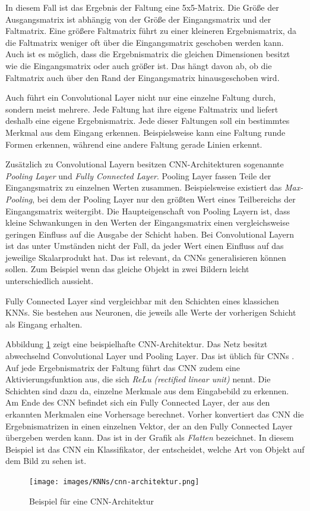 In diesem Fall ist das Ergebnis der Faltung eine 5x5-Matrix. Die Größe der Ausgangsmatrix ist abhängig von der Größe der Eingangsmatrix und der Faltmatrix. Eine größere Faltmatrix führt zu einer kleineren Ergebnismatrix, da die Faltmatrix weniger oft über die Eingangsmatrix geschoben werden kann. Auch ist es möglich, dass die Ergebnismatrix die gleichen Dimensionen besitzt wie die Eingangsmatrix oder auch größer ist. Das hängt davon ab, ob die Faltmatrix auch über den Rand der Eingangsmatrix hinausgeschoben wird. \cite{knnsKompakt}

Auch führt ein Convolutional Layer nicht nur eine einzelne Faltung durch, sondern meist mehrere. Jede Faltung hat ihre eigene Faltmatrix und liefert deshalb eine eigene Ergebnismatrix. Jede dieser Faltungen soll ein bestimmtes Merkmal aus dem Eingang erkennen. Beispielsweise kann eine Faltung runde Formen erkennen, während eine andere Faltung gerade Linien erkennt. 

Zusätzlich zu Convolutional Layern besitzen \ac{CNN}-Architekturen sogenannte \emph{Pooling Layer} und \emph{Fully Connected Layer}. Pooling Layer fassen Teile der Eingangsmatrix zu einzelnen Werten zusammen. Beispielsweise existiert das \emph{Max-Pooling}, bei dem der Pooling Layer nur den größten Wert eines Teilbereichs der Eingangsmatrix weitergibt. Die Haupteigenschaft von Pooling Layern ist, dass kleine Schwankungen in den Werten der Eingangsmatrix einen vergleichsweise geringen Einfluss auf die Ausgabe der Schicht haben. Bei Convolutional Layern ist das unter Umständen nicht der Fall, da jeder Wert einen Einfluss auf das jeweilige Skalarprodukt hat. Das ist relevant, da \acp{CNN} generalisieren können sollen. Zum Beispiel wenn das gleiche Objekt in zwei Bildern leicht unterschiedlich aussieht. \cite{DeepLearningBook}

Fully Connected Layer sind vergleichbar mit den Schichten eines klassichen \acp{KNN}. Sie bestehen aus Neuronen, die jeweils alle Werte der vorherigen Schicht als Eingang erhalten. \cite{DeepLearningBook}

Abbildung \ref{fig:cnn-architecture} zeigt eine beispielhafte \ac{CNN}-Architektur. 
Das Netz besitzt abwechselnd Convolutional Layer und Pooling Layer. Das ist üblich für \acp{CNN} \cite{DeepLearningBook}. Auf jede Ergebnismatrix der Faltung führt das \ac{CNN} zudem eine Aktivierungsfunktion aus, die sich \emph{ReLu} \emph{(rectified linear unit)} nennt. Die Schichten sind dazu da, einzelne Merkmale aus dem Eingabebild zu erkennen. Am Ende des \ac{CNN} befindet sich ein Fully Connected Layer, der aus den erkannten Merkmalen eine Vorhersage berechnet. Vorher konvertiert das \ac{CNN} die Ergebnismatrizen in einen einzelnen Vektor, der an den Fully Connected Layer übergeben werden kann. Das ist in der Grafik als \emph{Flatten} bezeichnet. In diesem Beispiel ist das \ac{CNN} ein Klassifikator, der entscheidet, welche Art von Objekt auf dem Bild zu sehen ist.\begin{figure}[h]
   \centering
   \texttt{[image: images/KNNs/cnn-architektur.png]}
   \caption{Beispiel für eine \ac{CNN}-Architektur \emph{\cite{cnn-architektur-img}}}
   \label{fig:cnn-architecture}
\end{figure}
